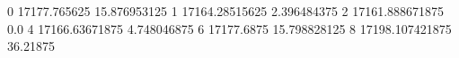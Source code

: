 0 17177.765625 15.876953125
1 17164.28515625 2.396484375
2 17161.888671875 0.0
4 17166.63671875 4.748046875
6 17177.6875 15.798828125
8 17198.107421875 36.21875
